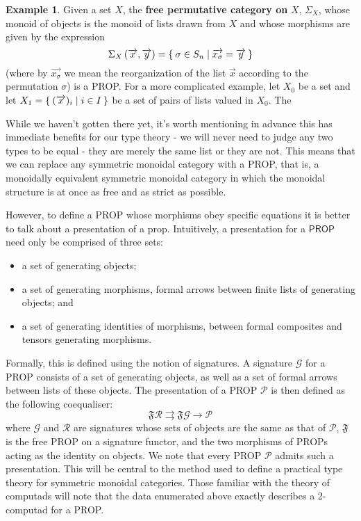 \documentclass[pra,floatfix,
amsmath,superscriptaddress, 12pt]{article}
\theoremstyle{definition}
\newtheorem*{example}{Example}
\newcommand{\mc}[1]{\mathcal{#1}}
\begin{document}
\begin{example}
Given a set $X$, the \textbf{free permutative category on} $X$, $\Sigma_{X}$, whose monoid of objects is the monoid of lists drawn from $X$ and whose morphisms are given by the expression
\[
    \Sigma_{X}\left(\overrightarrow{x},\overrightarrow{y}\right)
    =
    \Set{\sigma \in S_{n} | \overrightarrow{x_\sigma}=\overrightarrow{y}}
\]
(where by $\overrightarrow{x_\sigma}$ we mean the reorganization of the list $\overrightarrow{x}$ according to the permutation $\sigma$) is a \textsf{PROP}.
    For a more complicated example, let $X_0$ be a set and let $X_1=\Set{(\overrightarrow{x})_i | i \in I}$ be a set of pairs of lists valued in $X_0$. The
\end{example}
While we haven't gotten there yet, it's worth mentioning in advance this has immediate benefits for our type theory - we will never need to judge any two types to be equal - they are merely the same list or they are not.
This means that we can replace any symmetric monoidal category with a PROP, that is, a monoidally equivalent symmetric monoidal category in which the monoidal structure is at once as free and as strict as possible. 

However, to define a PROP whose morphisms obey specific equations it is better to talk about a presentation of a prop.
Intuitively, a presentation for a $\mathsf{PROP}$ need only be comprised of three sets:
\begin{itemize}
\item a set of generating objects;
\item a set of generating morphisms, formal arrows between finite lists
of generating objects; and
\item a set of generating identities of morphisms, between formal composites
and tensors generating morphisms.
\end{itemize}
Formally, this is defined using the notion of signatures. A signature $\mc{G}$ for a PROP consists of a set of generating objects, as well as a set of formal arrows between lists of these objects. The presentation of a PROP $\mc{P}$ is then defined as the following coequaliser: 
$$\mathfrak{F}\mc{R} \rightrightarrows \mathfrak{F}\mc{G} \rightarrow \mc{P}$$ where $\mc{G}$ and $\mc{R}$ are signatures whose sets of objects are the same as that of $\mc{P}$, $\mathfrak{F}$ is the free PROP on a signature functor, and the two morphisms of PROPs acting as the identity on objects.
We note that every PROP $\mc{P}$ admits such a presentation. This will be central to the method used to define a practical type theory for symmetric monoidal categories. Those familiar with the theory of computads will note that the data enumerated above exactly describes a 2-computad for a PROP.
\end{document}

